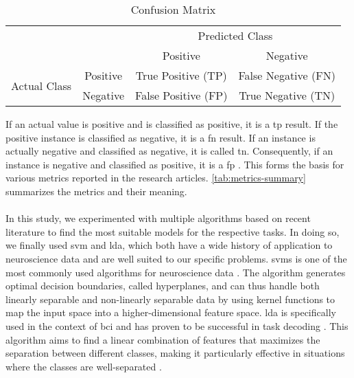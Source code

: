 \begin{table}[ht]
    \captionsetup{justification=raggedright,singlelinecheck=false}
    \caption{Confusion Matrix}
    \label{tab:confusion-matrix}
    \renewcommand{\arraystretch}{1.75}
    \centering
        \begin{tabular}{cc|c|c|}
            \cline{3-4}
            & & \multicolumn{2}{c|}{Predicted Class} \\ \cline{3-4} 
            & & Positive & Negative \\ \hline
            \multicolumn{1}{|c|}{\multirow{2}{*}{Actual Class}} & Positive & True Positive (TP) & False Negative (FN) \\ \cline{2-4} 
            \multicolumn{1}{|c|}{} & Negative & False Positive (FP) & True Negative (TN) \\ \hline
        \end{tabular}
\end{table}

\noindent If an actual value is positive and is classified as positive, it is a \gls{tp} result. If the positive instance is classified as negative, it is a \gls{fn} result. If an instance is actually negative and classified as negative, it is called \gls{tn}. Consequently, if an instance is negative and classified as positive, it is a \gls{fp} \cite{Fawcett2006}. This forms the basis for various metrics reported in the research articles. \autoref{tab:metrics-summary} summarizes the metrics and their meaning.\\
\\
In this study, we experimented with multiple algorithms based on recent literature to find the most suitable models for the respective tasks. In doing so, we finally used \gls{svm} and \gls{lda}, which both have a wide history of application to neuroscience data and are well suited to our specific problems.  \Glspl{svm} is one of the most commonly used algorithms for neuroscience data \cite{VAROQUAUX2017166}. The algorithm generates optimal decision boundaries, called hyperplanes, and can thus handle both linearly separable and non-linearly separable data by using kernel functions to map the input space into a higher-dimensional feature space. \Gls{lda} is specifically used in the context of \Gls{bci} and has proven to be successful in task decoding \cite{Blankertz2008}. This algorithm aims to find a linear combination of features that maximizes the separation between different classes, making it particularly effective in situations where the classes are well-separated \cite{shoorangiz2021eeg}. 

